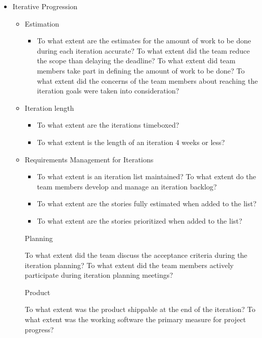 \begin{appendices}
\begin{itemize}
\begin{itemize}
\begin{itemize}
				\end{itemize}
		\end{itemize}
	\item Iterative Progression
		\begin{itemize}
			\item Estimation
				\begin{itemize}
					\item To what extent are the estimates for the amount of work to be done during each iteration accurate?
					\addition To what extent did the team reduce the scope than delaying the deadline?
					\addition To what extent did team members take part in defining the amount of work to be done?
					\addition To what extent did the concerns of the team members about reaching the iteration goals were taken into consideration?
				\end{itemize}
			\item Iteration length
				\begin{itemize}
					\item To what extent are the iterations timeboxed?
					\item To what extent is the length of an iteration 4 weeks or less?
				\end{itemize}
			\item Requirements Management for Iterations
				\begin{itemize}
					\item To what extent is an iteration list maintained?
					\addition To what extent do the team members develop and manage an iteration backlog?
					\item To what extent are the stories fully estimated when added to the list?
					\item To what extent are the stories prioritized when added to the list?
				\end{itemize}
			\addition Planning
				\begin{itemize}
					\addition To what extent did the team discuss the acceptance criteria during the iteration planning?
					\addition To what extent did the team members actively participate during iteration planning meetings?
				\end{itemize}
			\addition Product
				\begin{itemize}
					\addition To what extent was the product shippable at the end of the iteration?
					\addition To what extent was the working software the primary measure for project progress?

\end{itemize}
\end{itemize}
\end{itemize}
\end{appendices}
